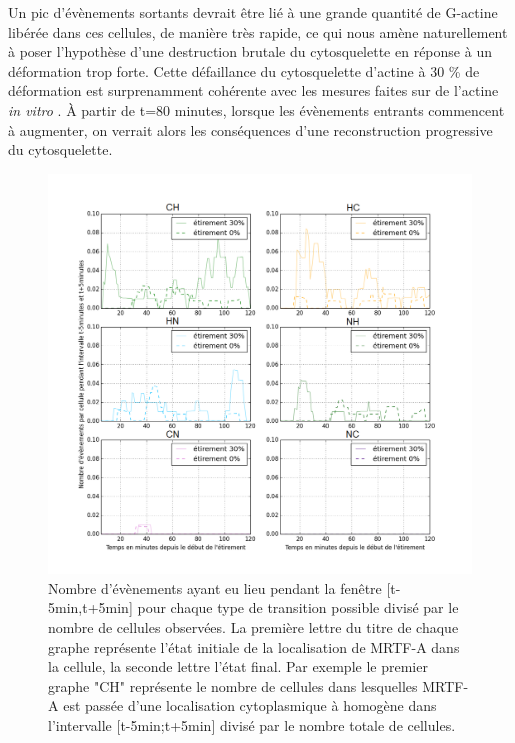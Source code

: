 Un pic d'évènements sortants devrait être lié à une grande quantité de G-actine libérée dans ces cellules, de manière très rapide, ce qui nous amène naturellement à poser l'hypothèse d'une destruction brutale du cytosquelette en réponse à un déformation trop forte. Cette défaillance du cytosquelette d'actine à 30 \% de déformation est surprenamment cohérente avec les mesures faites sur de l'actine \textit{in vitro} \cite{janmey}. 
À partir de t=80 minutes, lorsque les évènements entrants commencent à augmenter, on verrait alors les conséquences d'une reconstruction progressive du cytosquelette. 

 
\begin{figure}
\includegraphics[scale=0.5]{Figures/Etirement30_vs_0_translocations.png}
\caption{\label{Et30_transloc} Nombre d'évènements ayant eu lieu pendant la fenêtre [t-5min,t+5min] pour chaque type de transition possible divisé par le nombre de cellules observées. La première lettre du titre de chaque graphe représente l'état initiale de la localisation de MRTF-A dans la cellule, la seconde lettre l'état final. Par exemple le premier graphe "CH" représente le nombre de cellules dans lesquelles MRTF-A est passée d'une localisation cytoplasmique à homogène dans l'intervalle [t-5min;t+5min] divisé par le nombre totale de cellules. }
\end{figure}

